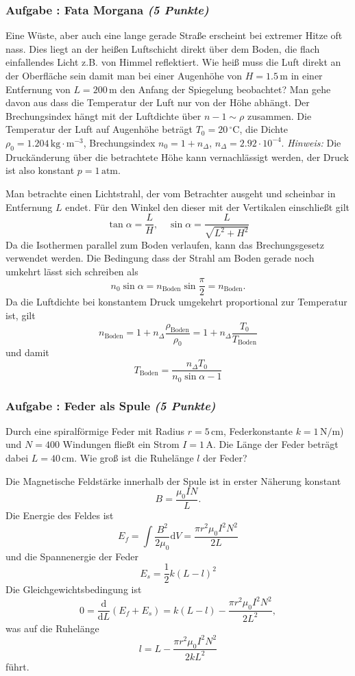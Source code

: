 \documentclass[12pt,a4paper]{article}
\newcommand{\ee}[1]{\cdot 10^{#1}}
\newcommand{\unit}[1]{\,\mathrm{#1}}
\newcommand{\dif}{\mathrm{d}}
\newcommand{\tdif}[2]{\frac{\dif#1}{\dif#2}}
\newcommand{\cel}{\,^\circ\mathrm{C}}
\newcommand{\hinweis}{\emph{Hinweis:} }
\newcounter{numlabel}
\newenvironment{problem}[2]{\stepcounter{numlabel} \vspace{1ex} \subsubsection*{Aufgabe \the\value{numlabel}: #1 \emph{(#2 Punkte)}} \renewcommand{\Currentlabel}{Aufgabe \the\value{numlabel}: #1}}{

}
\begin{document}
\begin{problem}{Fata Morgana}{5}
Eine Wüste, aber auch eine lange gerade Straße erscheint bei extremer Hitze oft nass. Dies liegt an der heißen Luftschicht direkt über dem Boden, die flach einfallendes Licht z.B. von Himmel reflektiert. Wie heiß muss die Luft direkt an der Oberfläche sein damit man bei einer Augenhöhe von $H = 1.5 \unit{m}$ in einer Entfernung von $L = 200 \unit{m}$ den Anfang der Spiegelung beobachtet? Man gehe davon aus dass die Temperatur der Luft nur von der Höhe abhängt. Der Brechungsindex hängt mit der Luftdichte über $n-1 \sim \rho$ zusammen. Die Temperatur der Luft auf Augenhöhe beträgt $T_0 = 20 \cel$, die Dichte $\rho_0 = 1.204 \unit{kg \cdot m^{-3}}$, Brechungsindex $n_0 = 1 + n_\Delta$, $n_\Delta = 2.92\ee{-4}$. \hinweis Die Druckänderung über die betrachtete Höhe kann vernachlässigt werden, der Druck ist also konstant $p = 1 \unit{atm}$.
\begin{solution}
Man betrachte einen Lichtstrahl, der vom Betrachter ausgeht und scheinbar in Entfernung $L$ endet. Für den Winkel den dieser mit der Vertikalen einschließt gilt
\[
\tan\alpha = \frac{L}{H}, \quad \sin\alpha = \frac{L}{\sqrt{L^2 + H^2}}
\]
Da die Isothermen parallel zum Boden verlaufen, kann das Brechungsgesetz verwendet werden. Die Bedingung dass der Strahl am Boden gerade noch umkehrt lässt sich schreiben als
\[
n_0 \sin\alpha = n_\mathrm{Boden} \sin\frac\pi2 = n_\mathrm{Boden}.
\]
Da die Luftdichte bei konstantem Druck umgekehrt proportional zur Temperatur ist, gilt
\[
n_\mathrm{Boden} = 1 + n_\Delta \frac{\rho_\mathrm{Boden}}{\rho_0} = 1 + n_\Delta \frac{T_0}{T_\mathrm{Boden}}
\]
und damit
\[
T_\mathrm{Boden} = \frac{ n_\Delta T_0 }{ n_0 \sin\alpha - 1 }
\]
\end{solution}
\end{problem}


\begin{problem}{Feder als Spule}{5}
Durch eine spiralförmige Feder mit Radius $r = 5 \unit{cm}$, Federkonstante $k = 1 \unit{N/m}$) und $N = 400$ Windungen fließt ein Strom $I = 1 \unit{A}$. Die Länge der Feder beträgt dabei $L = 40 \unit{cm}$. Wie groß ist die Ruhelänge $l$ der Feder?
\begin{solution}
Die Magnetische Feldstärke innerhalb der Spule ist in erster Näherung konstant
\[
B = \frac{\mu_0 I N}{L}.
\]
Die Energie des Feldes ist
\[
E_f = \int \frac{B^2}{2 \mu_0} \dif V = \frac{\pi r^2 \mu_0 I^2 N^2 }{2 L}
\]
und die Spannenergie der Feder
\[
E_s = \frac12 k \left( L - l \right)^2
\]
Die Gleichgewichtsbedingung ist
\[
0 = \tdif{}{L}(E_f + E_s) = k \left( L - l \right) - \frac{\pi r^2 \mu_0 I^2 N^2 }{2 L^2},
\]
was auf die Ruhelänge
\[
l  =  L - \frac{\pi r^2 \mu_0 I^2 N^2 }{2 k L^2}
\]
führt.
\end{solution}
\end{problem}
\end{document}
